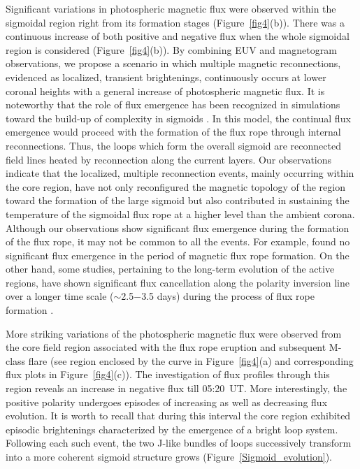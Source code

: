 \documentclass[twocolumn]{aastex6}
\begin{document}
{Significant variations in photospheric magnetic flux were observed within the sigmoidal region right from its formation stages (Figure~\ref{fig4}(b)).
There was a continuous increase of both positive and negative flux when the whole sigmoidal region is considered (Figure~\ref{fig4}(b)). 
By combining EUV and magnetogram observations, we propose a scenario in which multiple magnetic reconnections, evidenced as localized, transient brightenings, continuously occurs at lower coronal heights with a general increase of photospheric magnetic flux. It is noteworthy that the role of flux emergence has been recognized in simulations toward the build-up of complexity in sigmoids \citep{Archontis2009}. In this model, the continual flux emergence would proceed with the formation of the flux rope through internal reconnections. Thus, the loops which form the overall sigmoid are reconnected field lines heated by reconnection along the current layers.
Our observations indicate that the localized, multiple reconnection events, mainly occurring within the core region, have not only reconfigured the magnetic topology of the region toward the formation of the large sigmoid but also contributed in sustaining the temperature of the sigmoidal flux rope at a higher level than the ambient corona. Although our observations show significant flux emergence during the formation of the flux rope, it may not be common to all the events. For example, \cite{Cheng2014_double_MFR} found no significant flux emergence in the period of magnetic flux rope formation. On the other hand, some studies, pertaining to the long-term evolution of the active regions, have shown significant flux cancellation along the polarity inversion line over a longer time scale ($\sim$2.5$-$3.5 days) during the process of flux rope formation \citep{Green2011,Yardley2016}.

More striking variations of the photospheric magnetic flux were observed from the core field region associated with the flux rope eruption and subsequent M-class flare (see region enclosed by the curve in Figure~\ref{fig4}(a) and corresponding flux plots in Figure~\ref{fig4}(c)). The investigation of flux profiles through this region reveals an increase in negative flux till 05:20~UT. More interestingly, the positive polarity undergoes episodes of increasing as well as decreasing flux evolution. It is worth to recall that during this interval the core region exhibited episodic brightenings characterized by the emergence of a bright loop system. Following each such event, the two J-like bundles of loops successively transform into a more coherent sigmoid structure grows (Figure~\ref{Sigmoid_evolution}).

}
\end{document}
